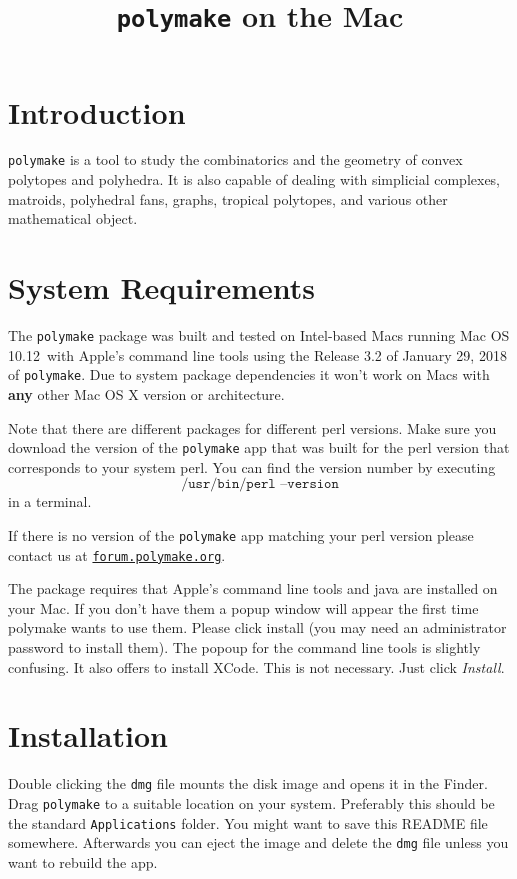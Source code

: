 \documentclass[a4paper]{amsart}
\title{\texttt{polymake} on the Mac\\\polymakeversion}
\newcommand{\macversion}{10.12}
\newcommand{\polymakeversion}{Release 3.2 of January 29, 2018\xspace}
\newcommand{\polymake}{\texttt{polymake}\xspace}
\begin{document}
\maketitle
\parindent0pt

\section*{Introduction}

\polymake is a tool to study the combinatorics and the geometry of convex polytopes and polyhedra. It is also capable of dealing with simplicial complexes, matroids, polyhedral fans, graphs, tropical polytopes, and various other mathematical object.

\section*{System Requirements}

The \polymake package was built and tested on Intel-based Macs running Mac OS \macversion\ with Apple's command line tools using the \polymakeversion of \polymake. Due to system package dependencies it won't work on Macs with \textbf{any} other Mac OS X version or architecture.

Note that there are different packages for different perl versions. Make sure you download the version of the \polymake app that was built for the perl version that corresponds to your system perl. You can find the version number by executing \[\texttt{/usr/bin/perl --version}\] in a terminal.

If there is no version of the \polymake app matching your perl version please contact us at \href{http://forum.polymake.org}{\tt forum.polymake.org}.

\bigskip
The package requires that Apple's command line tools and java are installed on your Mac. If you don't have them a popup window will appear the first time polymake wants to use them. Please click install (you may need an administrator password to install them). The popoup for the command line tools is slightly confusing. It also offers to install XCode. This is not necessary. Just click \emph{Install}.

\section*{Installation}

Double clicking the \texttt{dmg} file mounts the disk image and opens it in the Finder. Drag \polymake to a suitable location on your system. Preferably this should be the standard \texttt{Applications} folder. You might want to save this README file somewhere. Afterwards you can eject the image and delete the  \texttt{dmg} file unless you want to rebuild the app.
\end{document}
